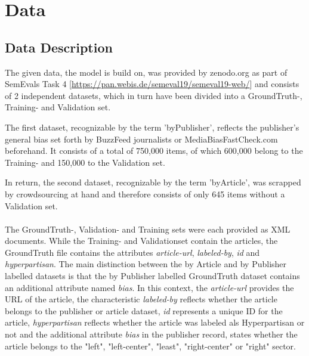 \documentclass[a4paper, 11pt,titlepage,oneside,openany]{book}
\begin{document}
\chapter{Data}
\label{cha:theory}


\section{Data Description}
 The given data, the model is build on, was provided by zenodo.org as part of SemEvals Task 4 [\url{https://pan.webis.de/semeval19/semeval19-web/}] and consists of 2 independent datasets, which in turn have been divided into a GroundTruth-, Training- and Validation set.
 
 \noindent The first dataset, recognizable by the term 'byPublisher', reflects the publisher's general bias set forth by BuzzFeed journalists or MediaBiasFastCheck.com beforehand. It consists of a total of 750,000 items, of which 600,000 belong to the Training- and 150,000 to the Validation set.
 
 \noindent In return, the second dataset, recognizable by the term 'byArticle', was scrapped by crowdsourcing at hand and therefore consists of only 645 items without a Validation set.\\
 \\
The GroundTruth-, Validation- and Training sets were each provided as XML documents. While the Training- and Validationset contain the articles, the GroundTruth file contains the attributes \textit{article-url}, \textit{labeled-by}, \textit{id} and \textit{hyperpartisan}. The main distinction between the by Article and by Publisher labelled datasets is that the by Publisher labelled GroundTruth dataset contains an additional attribute named \textit{bias}. In this context, the \textit{article-url} provides the URL of the article, the characteristic \textit{labeled-by} reflects whether the article belongs to the publisher or article dataset, \textit{id} represents a unique ID for the article, \textit{hyperpartisan} reflects whether the article was labeled als Hyperpartisan or not and the additional attribute \textit{bias} in the publisher record, states whether the article belongs to the "left", "left-center", "least", "right-center" or "right" sector.
 
\end{document}
